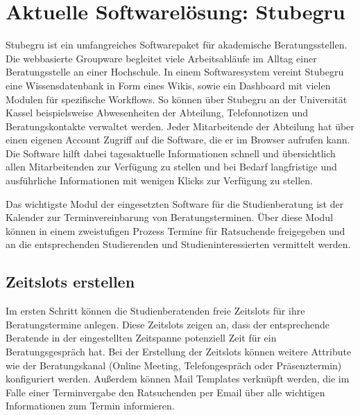 \section{Aktuelle Softwarelösung: Stubegru}
Stubegru ist ein umfangreiches Softwarepaket für akademische Beratungsstellen.
Die webbasierte Groupware begleitet viele Arbeitsabläufe im Alltag einer
Beratungsstelle an einer Hochschule. In einem Softwaresystem vereint Stubegru
eine Wissensdatenbank in Form eines Wikis, sowie ein Dashboard mit vielen
Modulen für spezifische Workflows. So können über Stubegru an der Universität
Kassel beispielsweise Abwesenheiten der Abteilung, Telefonnotizen und
Beratungskontakte verwaltet werden. Jeder Mitarbeitende der Abteilung hat über
einen eigenen Account Zugriff auf die Software, die er im Browser aufrufen
kann. Die Software hilft dabei tagesaktuelle Informationen schnell und
übersichtlich allen Mitarbeitenden zur Verfügung zu stellen und bei Bedarf
langfristige und ausführliche Informationen mit wenigen Klicks zur Verfügung zu
stellen\cite{stubegruWebsite}.

Das wichtigste Modul der eingesetzten Software für die Studienberatung ist der
Kalender zur Terminvereinbarung von Beratungsterminen. Über diese Modul können
in einem zweistufigen Prozess Termine für Ratsuchende freigegeben und an die
entsprechenden Studierenden und Studieninteressierten vermittelt werden.

\subsection*{Zeitslots erstellen}
Im ersten Schritt können die Studienberatenden freie Zeitslots für ihre
Beratungstermine anlegen. Diese Zeitslots zeigen an, dass der entsprechende
Beratende in der eingestellten Zeitspanne potenziell Zeit für ein
Beratungsgespräch hat. Bei der Erstellung der Zeitslots können weitere
Attribute wie der Beratungskanal (Online Meeting, Telefongespräch oder
Präsenztermin) konfiguriert werden. Außerdem können Mail Templates verknüpft
werden, die im Falle einer Terminvergabe den Ratsuchenden per Email über alle
wichtigen Informationen zum Termin informieren.

